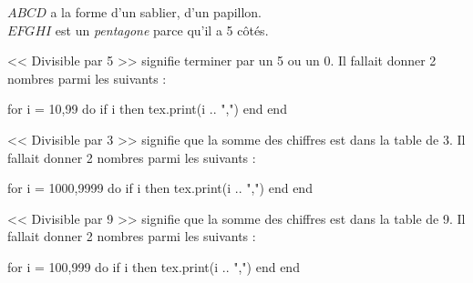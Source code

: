 \documentclass[../Cours.tex]{subfiles}
\begin{document}
\begin{questions}
    $ABCD$ a la forme d'un sablier, d'un papillon.\\
    $EFGHI$ est un \emph{pentagone} parce qu'il a 5 côtés.

        \question << Divisible par 5 >> signifie terminer par un 5 ou un 0. Il fallait donner 2 nombres parmi les suivants : 
        \begin{luacode}
for i = 10,99
do
    if i %
    then
        tex.print(i .. ",")
    end
end
        \end{luacode}
        \question << Divisible par 3 >> signifie que la somme des chiffres est dans la table de 3. Il fallait donner 2 nombres parmi les suivants :
        \begin{luacode}
for i = 1000,9999
do
    if i %
    then
        tex.print(i .. ",")
    end
end
        \end{luacode}
        \question << Divisible par 9 >> signifie que la somme des chiffres est dans la table de 9. Il fallait donner 2 nombres parmi les suivants :
        \begin{luacode}
for i = 100,999
do
    if i %
    then
        tex.print(i .. ",")
    end
end
        \end{luacode}


\end{questions}
\end{document}
